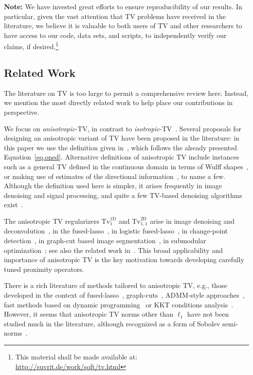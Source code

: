 \documentclass[twoside,11pt]{article}
\newcommand{\tvell}{\text{Tv}}
\newcommand{\oned}{\text{1D}}
\newcommand{\twod}{\text{2D}}
\numberwithin{equation}{section}
\numberwithin{theorem}{section}
\begin{document}
\vspace*{6pt}
\noindent\textbf{Note:} We have invested great efforts to ensure reproducibility of our results. In particular, given the vast attention that TV problems have received in the literature, we believe it is valuable to both users of TV and other researchers to have access to our code, data sets, and scripts, to independently verify our claims, if desired.\footnote{This material shall be made available at: \href{http://suvrit.de/work/soft/tv.html}{http://suvrit.de/work/soft/tv.html}}

\subsection{Related Work}
The literature on TV is too large to permit a comprehensive review here. Instead, we mention the most directly related work to help place our contributions in perspective.

We focus on \emph{anisotropic}-TV, in contrast to  \emph{isotropic}-TV~\citep{RudinTV92}. Several proposals for designing an anisotropic variant of TV have been proposed in the literature: in this paper we use the definition given in~\citet{TwIST}, which follows the already presented Equation~\eqref{eq.oned}. Alternative definitions of anisotropic TV include instances such as a general TV defined in the continuous domain in terms of Wulff shapes~\citep{esedogluAnisoTV}, or making use of estimates of the directional information~\citep{steidl2009}, to name a few. Although the definition used here is simpler, it arises frequently in image denoising and signal processing, and quite a few TV-based denoising algorithms exist~\citep[see e.g.]{ZhuTVAlg08}.

The anisotropic TV regularizers $\tvell_1^{\oned}$ and $\tvell_{1,1}^{\twod}$ arise in image denoising and deconvolution~\citep{DahlTV10}, in the fused-lasso~\citep{fl}, in logistic fused-lasso~\citep{kolar}, in change-point detection~\citep{harLev10}, in graph-cut based image segmentation~\citep{chaDar09}, in submodular optimization~\citep{jegBac13}; see also the related work in~\citep{vert}. This broad applicability and importance of anisotropic TV is the key motivation towards developing carefully tuned proximity operators.

There is a rich literature of methods tailored to anisotropic TV, e.g., those developed in the context of fused-lasso~\citep{frHaHoTi07,liuYe10}, graph-cuts~\citep{chaDar09}, ADMM-style approaches~\citep{Combettes09,BoydTV}, fast methods based on dynamic programming~\citep{dpTV} or KKT conditions analysis~\citep{fastTV}. However, it seems that anisotropic TV norms other than $\ell_1$ have not been studied much in the literature, although recognized as a form of Sobolev semi-norms~\citep{pontow09}.
\end{document}
